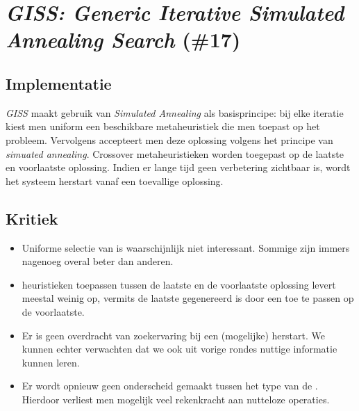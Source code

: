 \section{\emph{GISS: Generic Iterative Simulated Annealing Search} (\#17)}
\subsection{Implementatie}
\emph{GISS}\cite{chesc-giss} maakt gebruik van \emph{Simulated Annealing}\cite{citeulike:1612433} als basisprincipe: bij elke iteratie kiest men uniform een beschikbare metaheuristiek die men toepast op het probleem. Vervolgens accepteert men deze oplossing volgens het principe van \emph{simuated annealing}. Crossover metaheuristieken worden toegepast op de laatste en voorlaatste oplossing. Indien er lange tijd geen verbetering zichtbaar is, wordt het systeem herstart vanaf een toevallige oplossing.

\subsection{Kritiek}
\begin{itemize}
 \item Uniforme selectie van \abllhn{} is waarschijnlijk niet interessant. Sommige \abllhn{} zijn immers nagenoeg overal beter dan anderen.
 \item \abco{} heuristieken toepassen tussen de laatste en de voorlaatste oplossing levert meestal weinig op, vermits de laatste gegenereerd is door een \abllh{} toe te passen op de voorlaatste.
 \item Er is geen overdracht van zoekervaring bij een (mogelijke) herstart. We kunnen echter verwachten dat we ook uit vorige rondes nuttige informatie kunnen leren.
 \item Er wordt opnieuw geen onderscheid gemaakt tussen het type van de \abllhn{}. Hierdoor verliest men mogelijk veel rekenkracht aan nutteloze operaties.
\end{itemize}